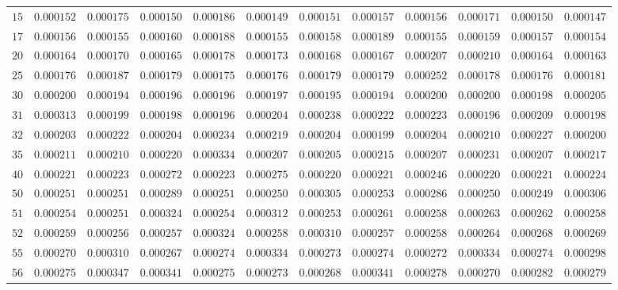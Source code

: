 \begin{sidewaystable}
\begin{tabular}{r|rrrrrrrrrrr}
$15$ & $0.000152$ & $0.000175$ & $0.000150$ & $0.000186$ & $0.000149$ & $0.000151$ & $0.000157$ & $0.000156$ & $0.000171$ & $0.000150$ & $0.000147$ \\
$17$ & $0.000156$ & $0.000155$ & $0.000160$ & $0.000188$ & $0.000155$ & $0.000158$ & $0.000189$ & $0.000155$ & $0.000159$ & $0.000157$ & $0.000154$ \\
$20$ & $0.000164$ & $0.000170$ & $0.000165$ & $0.000178$ & $0.000173$ & $0.000168$ & $0.000167$ & $0.000207$ & $0.000210$ & $0.000164$ & $0.000163$ \\
$25$ & $0.000176$ & $0.000187$ & $0.000179$ & $0.000175$ & $0.000176$ & $0.000179$ & $0.000179$ & $0.000252$ & $0.000178$ & $0.000176$ & $0.000181$ \\
$30$ & $0.000200$ & $0.000194$ & $0.000196$ & $0.000196$ & $0.000197$ & $0.000195$ & $0.000194$ & $0.000200$ & $0.000200$ & $0.000198$ & $0.000205$ \\
$31$ & $0.000313$ & $0.000199$ & $0.000198$ & $0.000196$ & $0.000204$ & $0.000238$ & $0.000222$ & $0.000223$ & $0.000196$ & $0.000209$ & $0.000198$ \\
$32$ & $0.000203$ & $0.000222$ & $0.000204$ & $0.000234$ & $0.000219$ & $0.000204$ & $0.000199$ & $0.000204$ & $0.000210$ & $0.000227$ & $0.000200$ \\
$35$ & $0.000211$ & $0.000210$ & $0.000220$ & $0.000334$ & $0.000207$ & $0.000205$ & $0.000215$ & $0.000207$ & $0.000231$ & $0.000207$ & $0.000217$ \\
$40$ & $0.000221$ & $0.000223$ & $0.000272$ & $0.000223$ & $0.000275$ & $0.000220$ & $0.000221$ & $0.000246$ & $0.000220$ & $0.000221$ & $0.000224$ \\
$50$ & $0.000251$ & $0.000251$ & $0.000289$ & $0.000251$ & $0.000250$ & $0.000305$ & $0.000253$ & $0.000286$ & $0.000250$ & $0.000249$ & $0.000306$ \\
$51$ & $0.000254$ & $0.000251$ & $0.000324$ & $0.000254$ & $0.000312$ & $0.000253$ & $0.000261$ & $0.000258$ & $0.000263$ & $0.000262$ & $0.000258$ \\
$52$ & $0.000259$ & $0.000256$ & $0.000257$ & $0.000324$ & $0.000258$ & $0.000310$ & $0.000257$ & $0.000258$ & $0.000264$ & $0.000268$ & $0.000269$ \\
$55$ & $0.000270$ & $0.000310$ & $0.000267$ & $0.000274$ & $0.000334$ & $0.000273$ & $0.000274$ & $0.000272$ & $0.000334$ & $0.000274$ & $0.000298$ \\
$56$ & $0.000275$ & $0.000347$ & $0.000341$ & $0.000275$ & $0.000273$ & $0.000268$ & $0.000341$ & $0.000278$ & $0.000270$ & $0.000282$ & $0.000279$ \\

\end{tabular}
\end{sidewaystable}
